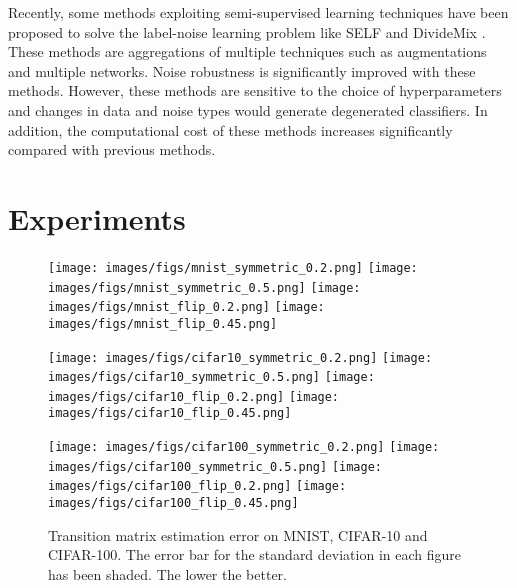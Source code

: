 \documentclass{article}
\begin{document}
Recently, some methods exploiting semi-supervised learning techniques have been proposed to solve the label-noise learning problem like SELF \cite{nguyen2019self} and DivideMix \cite{li2019dividemix}. These methods are aggregations of multiple techniques such as augmentations and multiple networks. Noise robustness is significantly improved with these methods. However, these methods are sensitive to the choice of hyperparameters and changes in data and noise types would generate degenerated classifiers. In addition, the computational cost of these methods increases significantly compared with previous methods. 



\section{Experiments}


   \begin{figure*}
     \centering
     
     \texttt{[image: images/figs/mnist\_symmetric\_0.2.png]}
     \texttt{[image: images/figs/mnist\_symmetric\_0.5.png]}   
     \texttt{[image: images/figs/mnist\_flip\_0.2.png]}
     \texttt{[image: images/figs/mnist\_flip\_0.45.png]}
\vspace{5mm}

     \texttt{[image: images/figs/cifar10\_symmetric\_0.2.png]}
     \texttt{[image: images/figs/cifar10\_symmetric\_0.5.png]}
     \texttt{[image: images/figs/cifar10\_flip\_0.2.png]}
     \texttt{[image: images/figs/cifar10\_flip\_0.45.png]}
     
   \vspace{5mm}
  
     \texttt{[image: images/figs/cifar100\_symmetric\_0.2.png]}
     \texttt{[image: images/figs/cifar100\_symmetric\_0.5.png]}
     \texttt{[image: images/figs/cifar100\_flip\_0.2.png]}
     \texttt{[image: images/figs/cifar100\_flip\_0.45.png]}

\vspace{5mm}

    
     \caption{Transition matrix estimation error on MNIST, CIFAR-10 and CIFAR-100. The error bar for the standard deviation in each figure has been shaded. The lower the better.}
     \label{fig:est_error}
 \end{figure*}
 
\end{document}
